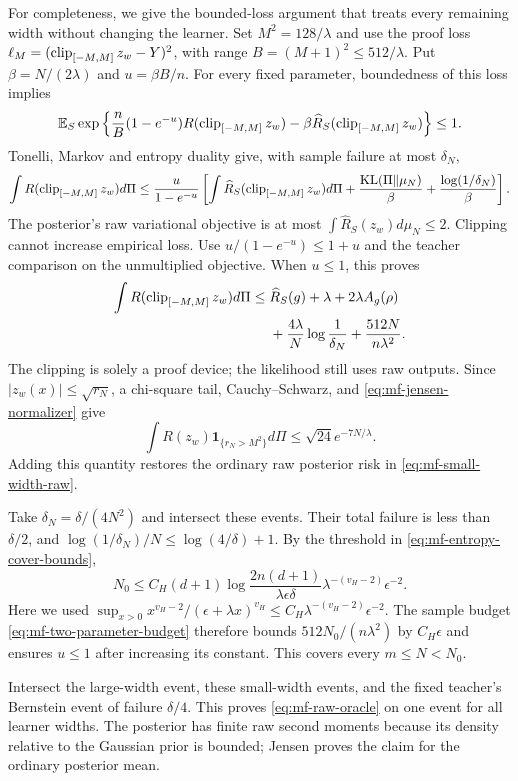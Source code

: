 For completeness, we give the bounded-loss argument that treats every
remaining width without changing the learner.  Set $M^2=128/\lambda$
and use the proof loss
$\ell_M=(\operatorname{clip}_{[-M,M]}z_w-Y)^2$, with range
$B=(M+1)^2\le512/\lambda$.
Put $\beta=N/(2\lambda)$ and $u=\beta B/n$.
For every fixed parameter, boundedness of this loss implies
\[
 \mathbb E_S\exp\left\{\frac nB(1-e^{-u})R(\operatorname{clip}_{[-M,M]}z_w)
                     -\beta\widehat R_S(\operatorname{clip}_{[-M,M]}z_w)\right\}
 \le1.
\]
Tonelli, Markov and entropy duality give, with sample failure at most
$\delta_N$,
\[
 \int R(\operatorname{clip}_{[-M,M]}z_w)d\Pi
 \le\frac u{1-e^{-u}}
 \left[\int\widehat R_S(\operatorname{clip}_{[-M,M]}z_w)d\Pi
       +\frac{\operatorname{KL}(\Pi\Vert\mu_N)}\beta
       +\frac{\log(1/\delta_N)}\beta\right].
\]
The posterior's raw variational objective is at most
$\int\widehat R_S(z_w)d\mu_N\le2$.  Clipping cannot increase empirical
loss.  Use $u/(1-e^{-u})\le1+u$ and the teacher comparison on the
unmultiplied objective.  When $u\le1$, this proves
\begin{align}
 \int R(\operatorname{clip}_{[-M,M]}z_w)d\Pi
 \le\;&\widehat R_S(g)+\lambda+2\lambda A_g(\rho)
 \notag\\
 &+\frac{4\lambda}{N}\log\frac1{\delta_N}
        +\frac{512N}{n\lambda^2}.
 \label{eq:mf-small-width-raw}
\end{align}
The clipping is solely a proof device; the likelihood still uses raw
outputs.  Since $|z_w(x)|\le\sqrt{r_N}$, a chi-square tail,
Cauchy--Schwarz, and \eqref{eq:mf-jensen-normalizer} give
\[
 \int R(z_w)\mathbf1_{\{r_N>M^2\}}d\Pi
                  \le\sqrt{24}e^{-7N/\lambda}.
\]
Adding this quantity restores the ordinary raw posterior risk in
\eqref{eq:mf-small-width-raw}.

Take $\delta_N=\delta/(4N^2)$ and intersect these events.  Their total
failure is less than $\delta/2$, and
$\log(1/\delta_N)/N\le\log(4/\delta)+1$.
By the threshold in \eqref{eq:mf-entropy-cover-bounds},
\[
 N_0\le C_H(d+1)\log\!\frac{2n(d+1)}{\lambda\epsilon\delta}
                 \lambda^{-(v_H-2)}\epsilon^{-2}.
\]
Here we used
$\sup_{x>0}x^{v_H-2}/(\epsilon+\lambda x)^{v_H}
\le C_H\lambda^{-(v_H-2)}\epsilon^{-2}$.
The sample budget \eqref{eq:mf-two-parameter-budget} therefore bounds
$512N_0/(n\lambda^2)$ by $C_H\epsilon$ and ensures $u\le1$ after
increasing its constant.  This covers every $m\le N<N_0$.

Intersect the large-width event, these small-width events, and the
fixed teacher's Bernstein event of failure $\delta/4$.  This proves
\eqref{eq:mf-raw-oracle} on one event for all learner widths.
The posterior has finite raw second moments because its density
relative to the Gaussian prior is bounded; Jensen proves the claim
for the ordinary posterior mean.

